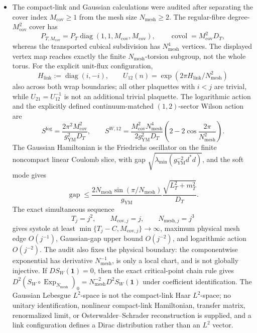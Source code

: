 \begin{itemize}[leftmargin=1.8em]
\item The compact-link and Gaussian calculations were audited after
separating the cover index $M_{\mathrm{cov}}\geq1$ from the mesh size
$N_{\mathrm{mesh}}\geq2$.  The regular-fibre degree-$M_{\mathrm{cov}}^2$
cover has
\[
 P_{T,M_{\mathrm{cov}}}
 =P_T\operatorname{diag}(1,1,M_{\mathrm{cov}},M_{\mathrm{cov}}),
 \qquad \operatorname{covol}=M_{\mathrm{cov}}^2D_T,
\]
whereas the transported cubical subdivision has
$N_{\mathrm{mesh}}^4$ vertices.  The displayed vertex map reaches exactly
the finite $N_{\mathrm{mesh}}$-torsion subgroup, not the whole torus.
For the explicit unit-flux configuration,
\[
 H_{\mathrm{link}}:=\operatorname{diag}(i,-i),\qquad
 U_{12}(n)=\exp(2\pi H_{\mathrm{link}}/N_{\mathrm{mesh}}^2)
\]
also across both wrap boundaries; all other plaquettes with $i<j$ are
trivial, while $U_{21}=U_{12}^{-1}$ is not an additional trivial
plaquette.  The logarithmic action and the explicitly defined
continuum-matched $(1,2)$-sector Wilson action are
\[
 S^{\log}=\frac{2\pi^2M_{\mathrm{cov}}^2}
                  {g_{\mathrm{YM}}^2D_T},\qquad
 S^{W,12}=\frac{M_{\mathrm{cov}}^2N_{\mathrm{mesh}}^4}
                  {2g_{\mathrm{YM}}^2D_T}
 \left(2-2\cos\frac{2\pi}{N_{\mathrm{mesh}}^2}\right).
\]
The Gaussian Hamiltonian is the Friedrichs oscillator on the finite
noncompact linear Coulomb slice, with gap
$\sqrt{\lambda_{\min}(g_{\mathrm{YM}}^{-2}d^*d)}$, and the soft mode gives
\[
 \operatorname{gap}\le
 \frac{2N_{\mathrm{mesh}}\sin(\pi/N_{\mathrm{mesh}})}{g_{\mathrm{YM}}}
 \frac{\sqrt{L_T^2+m_T^2}}{D_T}.
\]
The exact simultaneous sequence
\[
 T_j=j^2,\qquad M_{\mathrm{cov},j}=j,\qquad
 N_{\mathrm{mesh},j}=j^3
\]
gives systole at least
$\min\{T_j-C,M_{\mathrm{cov},j}\}\to\infty$, maximum physical mesh edge
$O(j^{-1})$, Gaussian-gap upper bound $O(j^{-2})$, and logarithmic action
$O(j^{-2})$.  The audit also fixes the physical boundary: the componentwise
exponential has derivative $N_{\mathrm{mesh}}^{-1}$, is only a local chart,
and is not globally injective.  If $DS_W(\mathbf1)=0$, then the exact
critical-point chain rule gives
$D^2(S_W\circ\operatorname{Exp}_{N_{\mathrm{mesh}}})_0=
N_{\mathrm{mesh}}^{-2}D^2S_W(\mathbf1)$ under coefficient identification.
The Gaussian Lebesgue $L^2$-space is not the
compact-link Haar $L^2$-space; no unitary identification, nonlinear
compact-link Hamiltonian, transfer matrix, renormalized limit, or
Osterwalder--Schrader reconstruction is supplied, and a link configuration
defines a Dirac distribution rather than an $L^2$ vector.


\end{itemize}

